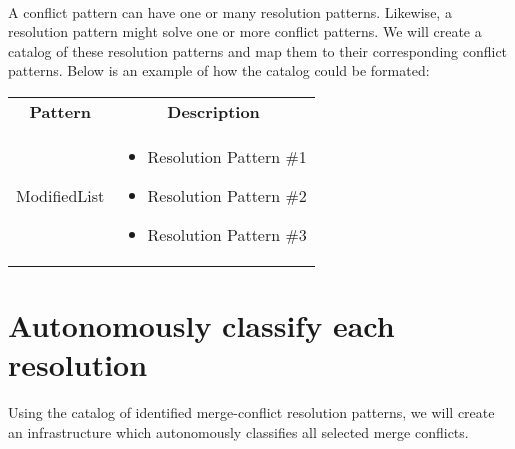 \paragraph*{}
A conflict pattern can have one or many resolution patterns. Likewise, a resolution pattern might solve one or more conflict patterns. We will create a catalog of these resolution patterns and map them to their corresponding conflict patterns. Below is an example of how the catalog could be formated:\\
\begin{tabular}{ p{8cm} p{6cm} }
\hline
\multicolumn{1}{c}{\textbf{Pattern}} & \multicolumn{1}{c}{\textbf{Description}}\\
ModifiedList &
\begin{itemize}
\item Resolution Pattern \#1
\item Resolution Pattern \#2
\item Resolution Pattern \#3
\end{itemize}
\end{tabular}
\section{Autonomously classify each resolution}
Using the catalog of identified merge-conflict resolution patterns, we will create an infrastructure which autonomously classifies all selected merge conflicts.